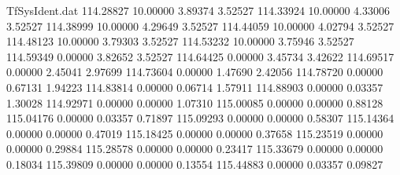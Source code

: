 \begin{filecontents}{TfSysIdent.dat}
 114.28827   10.00000    3.89374    3.52527
 114.33924   10.00000    4.33006    3.52527
 114.38999   10.00000    4.29649    3.52527
 114.44059   10.00000    4.02794    3.52527
 114.48123   10.00000    3.79303    3.52527
 114.53232   10.00000    3.75946    3.52527
 114.59349    0.00000    3.82652    3.52527
 114.64425    0.00000    3.45734    3.42622
 114.69517    0.00000    2.45041    2.97699
 114.73604    0.00000    1.47690    2.42056
 114.78720    0.00000    0.67131    1.94223
 114.83814    0.00000    0.06714    1.57911
 114.88903    0.00000    0.03357    1.30028
 114.92971    0.00000    0.00000    1.07310
 115.00085    0.00000    0.00000    0.88128
 115.04176    0.00000    0.03357    0.71897
 115.09293    0.00000    0.00000    0.58307
 115.14364    0.00000    0.00000    0.47019
 115.18425    0.00000    0.00000    0.37658
 115.23519    0.00000    0.00000    0.29884
 115.28578    0.00000    0.00000    0.23417
 115.33679    0.00000    0.00000    0.18034
 115.39809    0.00000    0.00000    0.13554
 115.44883    0.00000    0.03357    0.09827
\end{filecontents}
